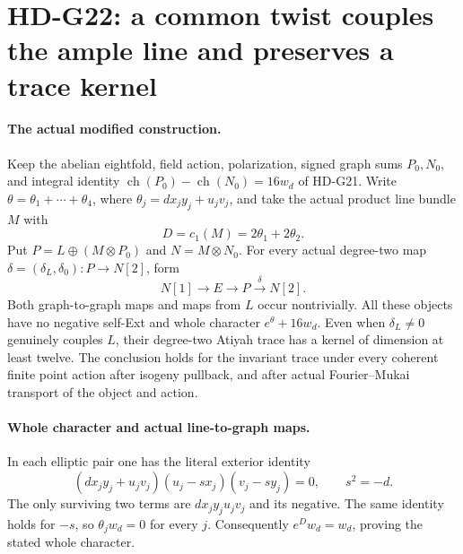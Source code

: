 \section{HD-G22: a common twist couples the ample line and preserves a trace kernel}
\label{sec:coupled-common-twist}

\paragraph{The actual modified construction.}
Keep the abelian eightfold, field action, polarization, signed graph
sums \(P_0,N_0\), and integral identity
\(\operatorname{ch}(P_0)-\operatorname{ch}(N_0)=16w_d\) of HD-G21.
Write \(\theta=\theta_1+\cdots+\theta_4\), where
\(\theta_j=d x_jy_j+u_jv_j\), and take the actual product line bundle
\(M\) with
\[
             D=c_1(M)=2\theta_1+2\theta_2.
\]
Put \(P=L\oplus(M\otimes P_0)\) and \(N=M\otimes N_0\).
For every actual degree-two map \(\delta=(\delta_L,\delta_0):P\to N[2]\),
form
\begin{equation}\label{eq:G22-object}
 N[1]\longrightarrow E\longrightarrow P
                         \xrightarrow{\delta}N[2].
\end{equation}
Both graph-to-graph maps and maps from \(L\) occur nontrivially.
All these objects have no negative self-Ext and whole character
\(e^\theta+16w_d\). Even when \(\delta_L\ne0\) genuinely
couples \(L\), their degree-two Atiyah trace has a kernel of dimension
at least twelve. The conclusion holds for the invariant trace under
every coherent finite point action after isogeny pullback, and after
actual Fourier--Mukai transport of the object and action.

\paragraph{Whole character and actual line-to-graph maps.}
In each elliptic pair one has the literal exterior identity
\[
 (d x_jy_j+u_jv_j)(u_j-sx_j)(v_j-sy_j)=0,
 \qquad s^2=-d.
\]
The only surviving two terms are \(d x_jy_ju_jv_j\) and its
negative. The same identity holds for \(-s\), so
\(\theta_j w_d=0\) for every \(j\). Consequently
\(e^Dw_d=w_d\), proving the stated whole character.

